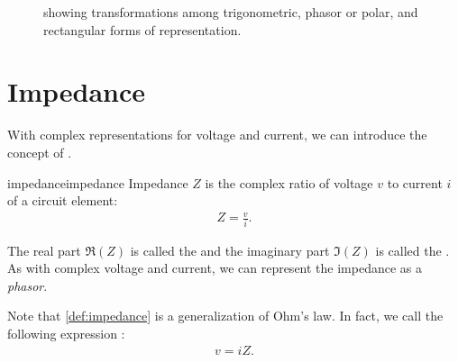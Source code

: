 \documentclass[electronics.tex]{subfiles}
\begin{document}
\begin{figure}
\centering
{}
\caption{showing transformations among trigonometric, phasor or polar, and rectangular forms of representation.}
\label{fig:trig_phasor_rectangular}
\end{figure}

\section{Impedance}
\tags{}

With complex representations for voltage and current, we can introduce the concept of .
\begin{Definition}{impedance}{impedance}
	Impedance $Z$ is the complex ratio of voltage $v$ to current $i$ of a circuit element:
	\begin{align*}
		Z = \frac{v}{i}.
	\end{align*}
\end{Definition}
The real part $\Re(Z)$ is called the  and the imaginary part $\Im(Z)$ is called the .
As with complex voltage and current, we can represent the impedance as a \emph{phasor}.

Note that \autoref{def:impedance} is a generalization of Ohm's law.
In fact, we call the following expression :
\begin{align}
	v = i Z.
\end{align}
\end{document}
